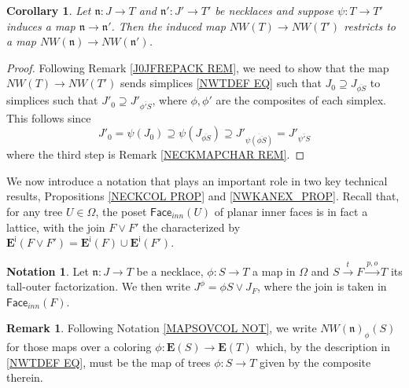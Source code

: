 \documentclass[a4paper,10pt
,draft
]{article}%
\numberwithin{equation}{section}
\numberwithin{figure}{section}
\newtheorem{corollary}[equation]{Corollary}%
\theoremstyle{definition} %
\newtheorem{remark}[equation]{Remark}%
\newtheorem{notation}[equation]{Notation}%
\newcommand{\1}{\ensuremath{\mathbbm 1}}%
\begin{document}
\begin{corollary}\label{NWTNS_NNAT_COR}
	Let $\mathfrak{n} \colon J \to T$ and
	$\mathfrak{n}' \colon J' \to T'$
	be necklaces and suppose 
	$\psi \colon T\to T'$
	induces a map $\mathfrak{n} \to \mathfrak{n}'$.
%	
	Then the induced map
	$NW(T) \to NW(T')$
	restricts to a map
	$NW(\mathfrak{n}) \to NW(\mathfrak{n}')$.
\end{corollary}



\begin{proof}
	Following Remark \ref{J0JFREPACK REM},
	we need to show that the map
	$NW(T) \to NW(T')$
	sends simplices \eqref{NWTDEF EQ}
	such that
	$J_0 \supseteq 
	J_{\overline{\phi S}}$
	to simplices such that
	$J'_0 \supseteq 
	J'_{\overline{\phi' S}}$,
	where $\phi,\phi'$ are the composites of each simplex.
	This follows since
\[
	J'_0 = 
	\psi (J_0) \supseteq
	\psi (J_{\overline{\phi S}})
	\supseteq
	J'_{\overline{\psi (\overline{\phi S})}}
	=
	J'_{\overline{\psi' S}}
\]	
where the third step is
Remark \ref{NECKMAPCHAR REM}.
\end{proof}



We now introduce a notation that plays an important role 
in two key technical results,
Propositions \ref{NECKCOL PROP} and 
\ref{NWKANEX_PROP}.
Recall that, for any tree 
$U \in \Omega$, 
the poset $\mathsf{Face}_{inn}(U)$
of planar inner faces is in fact a lattice,
with the join $F \vee F'$
the characterized by
$\boldsymbol{E}^{\mathsf{i}}(F \vee F') 
=
\boldsymbol{E}^{\mathsf{i}}(F)
\cup
\boldsymbol{E}^{\mathsf{i}}(F')$.


\begin{notation}\label{STAU NOT}
	Let $\mathfrak{n} \colon J \to T$
	be a necklace,
	$\phi\colon S \to T$ a map in $\Omega$
	and $S \xrightarrow{t} F \xrightarrow{p,o} T$
	its tall-outer factorization.
%
	We then write
	$J^{\phi} = \phi S \vee J_{F}$,
	where the join is 
	taken in $\mathsf{Face}_{inn}(F)$.
\end{notation}

\begin{remark}
	Following Notation \ref{MAPSOVCOL NOT},
	we write $NW(\mathfrak{n})_{\phi}(S)$ for those maps over a coloring $\phi \colon \boldsymbol{E}(S) \to \boldsymbol{E}(T)$
	which, by the description in \eqref{NWTDEF EQ},
	must be the map of trees $\phi\colon S \to T$
	given by the composite therein.
\end{remark}
\end{document}
